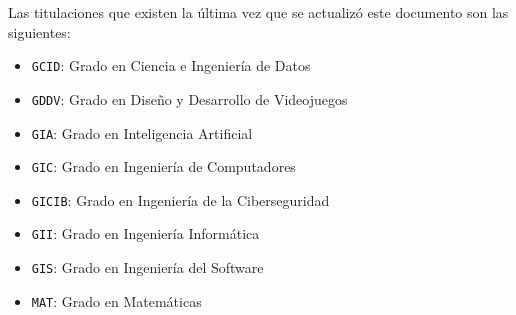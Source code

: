 Las titulaciones que existen la última vez que se actualizó este documento son las siguientes:

\begin{itemize}
    \item \texttt{GCID}: Grado en Ciencia e Ingeniería de Datos
    \item \texttt{GDDV}: Grado en Diseño y Desarrollo de Videojuegos
    \item \texttt{GIA}: Grado en Inteligencia Artificial
    \item \texttt{GIC}: Grado en Ingeniería de Computadores
    \item \texttt{GICIB}: Grado en Ingeniería de la Ciberseguridad
    \item \texttt{GII}: Grado en Ingeniería Informática
    \item \texttt{GIS}: Grado en Ingeniería del Software
    \item \texttt{MAT}: Grado en Matemáticas
\end{itemize}

